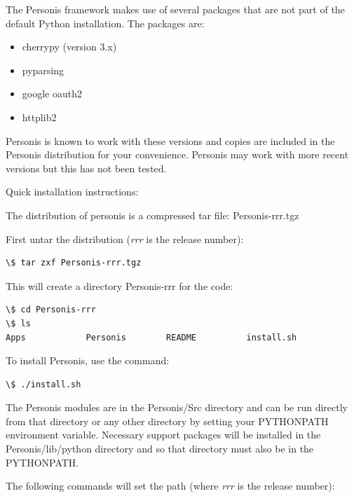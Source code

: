 \documentclass[a4paper,10pt,english]{sphinxmanual}
\begin{document}
The Personis framework makes use of several packages that are not part
of the default Python installation.
The packages are:
\begin{itemize}
\item {} 
cherrypy (version 3.x)

\item {} 
pyparsing

\item {} 
google oauth2

\item {} 
httplib2

\end{itemize}

Personis is known to work with these versions and copies are included in
the Personis distribution for your convenience. Personis may work with
more recent versions but this has not been tested.

Quick installation instructions:

The distribution of personis is a compressed tar file: Personis-rrr.tgz

First untar the distribution (\emph{rrr} is the release number):

\begin{Verbatim}[commandchars=\\\{\}]
\$ tar zxf Personis-rrr.tgz
\end{Verbatim}

This will create a directory Personis-rrr for the code:

\begin{Verbatim}[commandchars=\\\{\}]
\$ cd Personis-rrr
\$ ls
Apps            Personis        README          install.sh
\end{Verbatim}

To install Personis, use the command:

\begin{Verbatim}[commandchars=\\\{\}]
\$ ./install.sh
\end{Verbatim}

The Personis modules are in the Personis/Src directory and can be run directly
from that directory or any other directory by setting your PYTHONPATH
environment variable.
Necessary support packages will be installed in the Personis/lib/python
directory and so that directory must also be in the PYTHONPATH.

The following commands will set the path (where \emph{rrr} is the release number):
\end{document}

